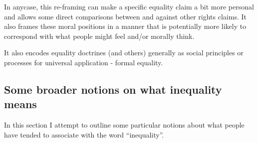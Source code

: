 \documentclass{article}
\begin{document}
In anycase, this re-framing can make a specific equality claim a bit more personal and allows some direct comparisons between and against other rights claims. It also frames these moral positions in a manner that is potentially more likely to correspond with what people might feel and/or morally think.

It also encodes equality doctrines (and others) generally as social principles or processes for universal application - formal equality.










\subsection{Some broader notions on what inequality means}



In this section I attempt to outline some particular notions about what people have tended to associate with the word ``inequality''.
\end{document}
